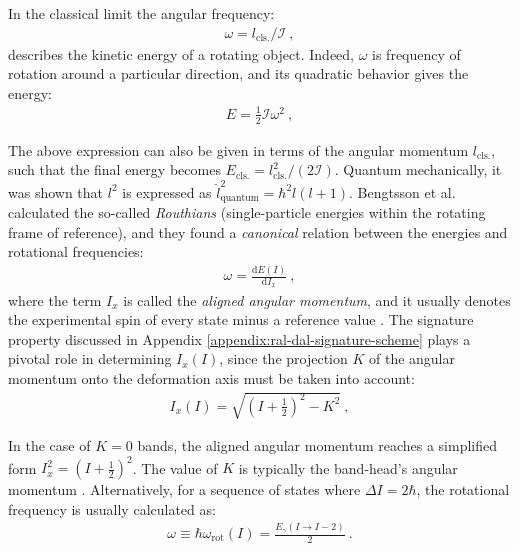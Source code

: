 In the classical limit the angular frequency:
\begin{align}
    \omega=l_\text{cls.}/\mathcal{I}\ ,
\end{align}
describes the kinetic energy of a rotating object. Indeed, $\omega$ is frequency of rotation around a particular direction, and its quadratic behavior gives the energy:
\begin{align}
    E=\frac{1}{2}\mathcal{I}\omega^2\ ,
\end{align}

The above expression can also be given in terms of the angular momentum $l_\text{cls.}$, such that the final energy becomes $E_\text{cls.}=l_\text{cls.}^2/(2\mathcal{I})$. Quantum mechanically, it was shown that $l^2$ is expressed as $\hat{l}^2_\text{quantum}=\hbar^2 l(l+1)$. Bengtsson et al. \cite{bengtsson1979quasiparticle} calculated the so-called \emph{Routhians} (single-particle energies within the rotating frame of reference), and they found a \emph {canonical} relation between the energies and rotational frequencies:
\begin{align}
    \omega=\frac{\text{d}E(I)}{\text{d}I_x}\ ,
    \label{rotational-frequency-canonical-definition}
\end{align}
where the term $I_x$ is called the \emph{aligned angular momentum}, and it usually denotes the experimental spin of every state minus a reference value \cite{harris1965higher}. The signature property discussed in Appendix \ref{appendix:ral-dal-signature-scheme} plays a pivotal role in determining $I_x(I)$, since the projection $K$ of the angular momentum onto the deformation axis must be taken into account:
\begin{align}
    I_x(I)=\sqrt{\left(I+\frac{1}{2}\right)^2-K^2}\ ,
    \label{aligned-angular-momentum}
\end{align}

In the case of $K=0$ bands, the aligned angular momentum reaches a simplified form $I_x^2=(I+\frac{1}{2})^2$. The value of $K$ is typically the band-head's angular momentum \cite{bengtsson1979quasiparticle,bengtsson1984signature}. Alternatively, for a sequence of states where $\Delta I=2\hbar$, the rotational frequency is usually calculated as:
\begin{align}
    \omega\equiv\hbar\omega_\text{rot}(I)=\frac{E_\gamma(I\to I-2)}{2}\ .
    \label{rotational-frequency-canonical}
\end{align}



